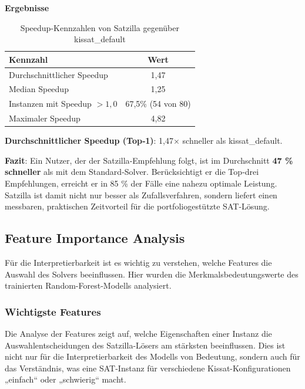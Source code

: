 \textbf{Ergebnisse}

\begin{table}[H]
    \centering
    \begin{tabular}{lc}
        \textbf{Kennzahl} & \textbf{Wert} \\
        \toprule
        Durchschnittlicher Speedup & 1,47 \\
        \midrule
        Median Speedup & 1,25 \\
        \midrule
        Instanzen mit Speedup $> 1{,}0$ & 67,5\% (54 von 80) \\
        \midrule
        Maximaler Speedup & 4,82 \\
        \bottomrule
    \end{tabular}
    \caption{Speedup-Kennzahlen von Satzilla gegenüber kissat\_default}\label{tab:speedup_stats}
\end{table}

\textbf{Durchschnittlicher Speedup (Top‑1)}: 1,47× schneller als kissat\_default.

\textbf{Fazit}: Ein Nutzer, der der Satzilla‑Empfehlung folgt, ist im Durchschnitt \textbf{47 \% schneller}
 als mit dem Standard‑Solver. Berücksichtigt er die Top‑drei Empfehlungen, erreicht er in 85 \% der 
 Fälle eine nahezu optimale Leistung. Satzilla ist damit nicht nur besser als Zufallsverfahren, 
sondern liefert einen messbaren, praktischen Zeitvorteil für die portfoliogestützte SAT‑Lösung.


\newpage

\subsection{Feature Importance Analysis}

Für die Interpretierbarkeit ist es wichtig zu verstehen, welche Features die Auswahl des Solvers 
beeinflussen. Hier wurden die Merkmalsbedeutungswerte des trainierten Random-Forest-Modells analysiert.

\subsubsection{Wichtigste Features}

Die Analyse der Features zeigt auf, welche Eigenschaften einer Instanz die Auswahlentscheidungen des 
Satzilla-Lösers am stärksten beeinflussen. Dies ist nicht nur für die Interpretierbarkeit des Modells von
Bedeutung, sondern auch für das Verständnis, was eine SAT-Instanz für verschiedene 
Kissat-Konfigurationen „einfach“ oder „schwierig“ macht.

